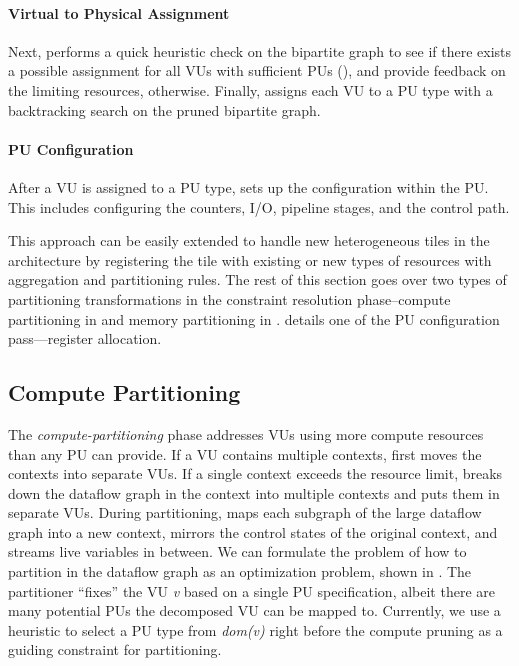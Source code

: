 \paragraph{Virtual to Physical Assignment}
Next, \name performs a quick heuristic check on the bipartite graph to see if there exists a
possible assignment for all VUs with sufficient PUs (), and provide feedback on the limiting resources, otherwise.
Finally, \name assigns each VU to a PU type with a backtracking search on the pruned bipartite
graph.

\paragraph{PU Configuration}
After a VU is assigned to a PU type, \name sets up the configuration within the PU.
This includes configuring the counters, I/O, pipeline stages, and the control path.

This approach can be easily extended to handle new heterogeneous tiles in the architecture by registering
the tile with existing or new types of resources with aggregation and partitioning rules.
The rest of this section goes over two types of partitioning transformations in the constraint
resolution phase--compute partitioning in  and memory partitioning in .
 details one of the PU configuration pass---register allocation.

\subsection{Compute Partitioning} 
\label{sec:compsplit}

The {\em compute-partitioning} phase addresses VUs using more compute resources than any PU can provide. 
If a VU contains multiple contexts, \name{} first moves the contexts into separate VUs.
If a single context exceeds the resource limit, \name breaks down the dataflow graph in the context into multiple contexts and puts them in separate VUs.
During partitioning, \name maps each subgraph of the large dataflow graph into a new context, mirrors the control states of the original context, and streams live variables in between.
We can formulate the problem of how to partition in the dataflow graph as an optimization problem, shown in
.
The partitioner ``fixes'' the VU \emph{v} based on a single PU specification, albeit there are many potential PUs 
the decomposed VU can be mapped to.
Currently, we use a heuristic to select a PU type from \emph{dom(v)} right before the compute pruning 
as a guiding constraint for partitioning.

